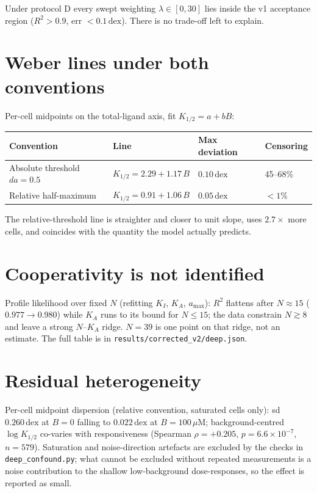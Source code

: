 \documentclass[11pt]{article}
\newcommand{\dex}{\ensuremath{\,\mathrm{dex}}}
\begin{document}
Under protocol D every swept weighting $\lambda\in[0,30]$ lies inside the v1 acceptance region
($R^2>0.9$, err $<0.1\dex$). There is no trade-off left to explain.

\section{Weber lines under both conventions}

Per-cell midpoints on the total-ligand axis, fit $K_{1/2}=a+bB$:

\begin{center}
\begin{tabular}{l l l l}
\toprule
Convention & Line & Max deviation & Censoring \\
\midrule
Absolute threshold $da=0.5$ & $K_{1/2}=2.29+1.17\,B$ & $0.10\dex$ & 45--68\% \\
Relative half-maximum & $K_{1/2}=0.91+1.06\,B$ & $0.05\dex$ & $<1\%$ \\
\bottomrule
\end{tabular}
\end{center}

The relative-threshold line is straighter and closer to unit slope, uses $2.7\times$ more cells,
and coincides with the quantity the model actually predicts.

\section{Cooperativity is not identified}

Profile likelihood over fixed $N$ (refitting $K_I$, $K_A$, $a_{\max}$): $R^2$ flattens after
$N\approx15$ ($0.977\to0.980$) while $K_A$ runs to its bound for $N\le15$; the data constrain
$N\gtrsim8$ and leave a strong $N$--$K_A$ ridge. $N=39$ is one point on that ridge, not an
estimate. The full table is in \texttt{results/corrected\_v2/deep.json}.

\section{Residual heterogeneity}

Per-cell midpoint dispersion (relative convention, saturated cells only): sd $0.260\dex$ at
$B=0$ falling to $0.022\dex$ at $B=100\,\mu$M; background-centred $\log K_{1/2}$ co-varies with
responsiveness (Spearman $\rho=+0.205$, $p=6.6\times10^{-7}$, $n=579$). Saturation and
noise-direction artefacts are excluded by the checks in \texttt{deep\_confound.py}; what cannot be
excluded without repeated measurements is a noise contribution to the shallow low-background
dose-responses, so the effect is reported as small.
\end{document}
